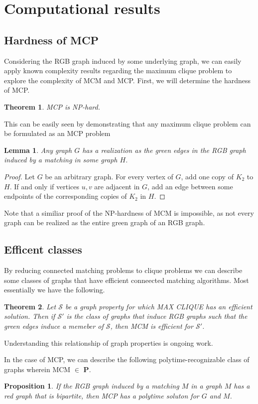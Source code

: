 \documentclass[12pt]{article}
\newtheorem{prop}{Proposition}
\newtheorem{lem}{Lemma}
\newtheorem{theorem}{Theorem}
\theoremstyle{definition}
\begin{document}
\section{Computational results}
\subsection{Hardness of MCP}
Considering the RGB graph induced by some underlying graph, we can easily apply known complexity results regarding the maximum clique problem to explore the complexity of MCM and MCP.  First, we will determine the hardness of MCP.
\begin{theorem}
	MCP is NP-hard.
\end{theorem}
This can be easily seen by demonstrating that any maximum clique problem can be formulated as an MCP problem
\begin{lem}
	Any graph $G$ has a realization as the green edges in the RGB graph induced by a matching in some graph $H$.
\end{lem}
\begin{proof}
	Let $G$ be an arbitrary graph.  For every vertex of $G$, add one copy of $K_2$ to $H$.  If and only if vertices $u,v$ are adjacent in $G$, add an edge between some endpoints of the corresponding copies of $K_2$ in $H$.
\end{proof}
Note that a similiar proof of the NP-hardness of MCM is impossible, as not every graph can be realized as the entire green graph of an RGB graph.
\subsection{Efficent classes}
By reducing connected matching problems to clique problems we can describe some classes of graphs that have efficient conneected matching algorithms.  Most essentially we have the following.
\begin{theorem}
	Let $\mathcal{S}$ be a graph property for which MAX CLIQUE has an efficient solution.  Then if $\mathcal{S'}$ is the class of graphs that induce RGB graphs such that the green edges induce a memeber of $\mathcal{S}$, then MCM is efficient for $\mathcal{S'}$. 
\end{theorem} 
Understanding this relationship of graph properties is ongoing work.

In the case of MCP, we can describe the following polytime-recognizable class of graphs wherein MCM $\in$ \textbf{P}.
\begin{prop}
	If the RGB graph induced by a matching $M$ in a graph $M$ has a red graph that is bipartite, then MCP has a polytime soluton for $G$ and $M$.
\end{prop}
\end{document}
